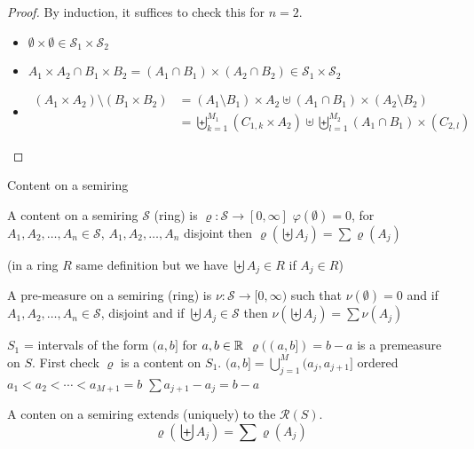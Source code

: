 \begin{proof}
  By induction, it suffices to check this for $n = 2$.
  \begin{itemize}
    \item $\emptyset \times \emptyset \in \mathcal{S}_1 \times \mathcal{S}_2$
    \item $A_1 \times A_2 \cap B_1 \times B_2 = (A_1 \cap B_1) \times (A_2 \cap B_2) \in \mathcal{S}_1 \times \mathcal{S}_2$
    \item \begin{align*}
      (A_1 \times A_2) \setminus (B_1 \times B_2) &= (A_1 \setminus B_1) \times A_2 \uplus (A_1 \cap B_1) \times (A_2 \setminus B_2) \\
      &= \biguplus_{k=1}^{M_1} (C_{1, k} \times A_2) \uplus \biguplus_{l=1}^{M_2} (A_1 \cap B_1) \times (C_{2, l})
    \end{align*}
  \end{itemize}
\end{proof}
Content on a semiring

\begin{definition}
  A content on a semiring $\mathcal{S}$ (ring) is 
  $\varrho : \mathcal{S} \to [0, \infty]$
  $\varphi(\emptyset) = 0$, for $A_1, A_2, \dotsc, A_n \in \mathcal{S}$, $A_1, A_2, \dotsc, A_n$ disjoint then
  $\varrho\left(\biguplus A_j\right) = \sum \varrho(A_j)$
\end{definition}
(in a ring $R$ same definition but we have $\biguplus A_j \in R$ if $A_j \in R$)

\begin{definition}
  A pre-measure on a semiring (ring) is $\nu: \mathcal{S} \to [0, \infty)$ such that
  $\nu(\emptyset) = 0$ and if $A_1, A_2, \dotsc, A_n \in \mathcal{S}$, disjoint and if 
  $\biguplus A_j \in \mathcal{S}$ then $\nu\left(\biguplus A_j\right) = \sum \nu(A_j)$
\end{definition}

\begin{example}
  $S_1$ = intervals of the form $(a, b]$ for $a, b\in \mathbb R$
  $\varrho((a, b]) = b-a$ is a premeasure on $S$.
  First check $\varrho$ is a content on $S_1$.
  $(a, b] = \bigcup_{j=1}^M (a_j, a_{j+1}]$ ordered $a_1 < a_2 < \dotsm < a_{M+1} = b$
  $\sum a_{j+1} - a_j = b-a$
\end{example}


\begin{theorem}
  A conten on a semiring extends (uniquely) to the $\mathcal{R}(S)$. 
  \[\varrho\left(\biguplus A_j\right) = \sum \varrho(A_j)\]
\end{theorem}


